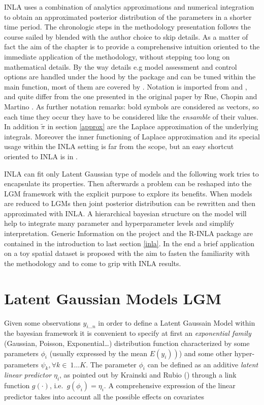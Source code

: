 \documentclass[
  12pt,
  a4paper,
  oneside]{book}
\theoremstyle{definition}
\theoremstyle{definition}
\theoremstyle{definition}
\theoremstyle{remark}
\begin{document}
INLA uses a combination of analytics approximations and numerical integration to obtain an approximated posterior distribution of the parameters in a shorter time period.
The chronologic steps in the methodology presentation follows the course sailed by \citet{Moraga2019} blended with the author choice to skip details. As a matter of fact the aim of the chapter is to provide a comprehensive intuition oriented to the immediate application of the methodology, without stepping too long on mathematical details. By the way details e.g model assessment and control options are handled under the hood by the package and can be tuned within the main function, most of them are covered by \citet{Bayesian_INLA_Rubio}. Notation is imported from \citet{Blangiardo-Cameletti} and \citet{Bayesian_INLA_Rubio}, and quite differ from the one presented in the original paper by Rue, Chopin and Martino \citeyearpar{Rue2009}. As further notation remarks: bold symbols are considered as vectors, so each time they occur they have to be considered like the \emph{ensamble} of their values. In addition \(\tilde\pi\) in section \ref{approx} are the Laplace approximation of the underlying integrals. Moreover the inner functioning of Laplace approximation and its special usage within the INLA setting is far from the scope, but an easy shortcut oriented to INLA is in \citet{Blangiardo-Cameletti}.

INLA can fit only Latent Gaussian type of models and the following work tries to encapsulate its properties. Then afterwards a problem can be reshaped into the LGM framework with the explicit purpose to explore its benefits. When models are reduced to LGMs then joint posterior distribution can be rewritten and then approximated with INLA. A hierarchical bayesian structure on the model will help to integrate many parameter and hyperparameter levels and simplify interpretation.
Generic Information on the project and the R-INLA package are contained in the introduction to last section \ref{inla}. In the end a brief application on a toy spatial dataset is proposed with the aim to fasten the familiarity with the methodology and to come to grip with INLA results.

\hypertarget{LGM}{%
\section{Latent Gaussian Models LGM}\label{LGM}}

Given some observations \(y_{i \ldots n}\) in order to define a Latent Gaussain Model within the bayesian framework it is convenient to specify at first an \emph{exponential family} (Gaussian, Poisson, Exponential\ldots) distribution function characterized by some parameters \(\phi_{i}\) (usually expressed by the mean \(\left.E\left(y_{i}\right)\right)\)) and some other hyper-parameters \(\psi_{k} ,\forall k \in \ 1\ldots K\). The parameter \(\phi_{i}\) can be defined as an additive \emph{latent linear predictor} \(\eta_{i}\), as pointed out by Krainski and Rubio (\citeyearpar{Krainski-Rubio}) through a link function \(g(\cdot)\), i.e.~\(g\left(\phi_{i}\right)=\eta_{i}\). A comprehensive expression of the linear predictor takes into account all the possible effects on covariates
\end{document}

